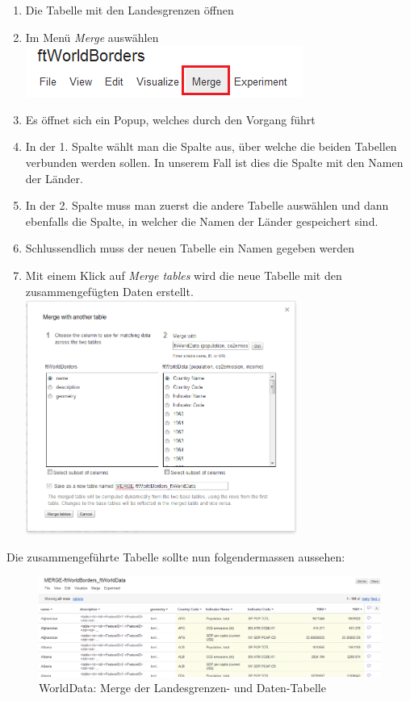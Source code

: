 \begin{enumerate}
\item Die Tabelle mit den Landesgrenzen öffnen
\item Im Menü \emph{\gls{Merge}} auswählen \\ \includegraphics{images/usecase1-worlddata/documentation/worlddata-merge1}
\item Es öffnet sich ein Popup, welches durch den Vorgang führt
\item In der 1. Spalte wählt man die Spalte aus, über welche die beiden Tabellen verbunden werden sollen. In unserem Fall ist dies die Spalte mit den Namen der Länder.
\item In der 2. Spalte muss man zuerst die andere Tabelle auswählen und dann ebenfalls die Spalte, in welcher die Namen der Länder gespeichert sind.
\item Schlussendlich muss der neuen Tabelle ein Namen gegeben werden
\item Mit einem Klick auf \emph{Merge tables} wird die neue Tabelle mit den zusammengefügten Daten erstellt. \\ \includegraphics[width=0.7\textwidth]{images/usecase1-worlddata/documentation/worlddata-merge2}
\end{enumerate}

Die zusammengeführte Tabelle sollte nun folgendermassen aussehen:

\begin{figure}[H]
	\centering
	\includegraphics[width=\textwidth]{images/usecase1-worlddata/documentation/worlddata-merge_done}
	\caption{WorldData: Merge der Landesgrenzen- und Daten-Tabelle}
	\label{worlddata-merge_done}
\end{figure}

